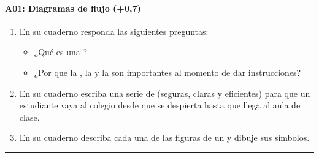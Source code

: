 \documentclass[letterpaper,10pt,spanish]{sphinxmanual}
\begin{document}
\paragraph{A01: Diagramas de flujo (+0,7)}
\label{\detokenize{cursos/ofimatica11/periodo01/G02:a01-diagramas-de-flujo-0-7}}
\sphinxAtStartPar
{}
\begin{enumerate}
%
\item {} 
\sphinxAtStartPar
En su cuaderno responda las siguientes preguntas:
\begin{itemize}
\item {} 
\sphinxAtStartPar
¿Qué es una ?

\item {} 
\sphinxAtStartPar
¿Por que la , la  y la  son importantes al momento de dar instrucciones?

\end{itemize}

\item {} 
\sphinxAtStartPar
En su cuaderno escriba una serie de  (seguras, claras y eficientes) para que un estudiante vaya al colegio desde que se despierta hasta que llega al aula de clase.

\item {} 
\sphinxAtStartPar
En su cuaderno describa cada una de las figuras de un  y dibuje sus símbolos.

\end{enumerate}


\bigskip\hrule\bigskip
\end{document}
